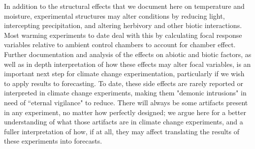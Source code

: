 \documentclass{article}
\begin{document}
\par In addition to the structural effects that we document here on temperature and moisture, experimental structures may alter conditions by reducing light, intercepting precipitation, and altering herbivory and other biotic interactions\citep{kennedy1995,wolkovich2012}. Most warming experiments to date deal with this by calculating focal response variables relative to ambient control chambers to account for chamber effect\citep [e.g.][]{marchin2015}. Further documentation and analysis of the effects on abiotic and biotic factors, as well as in depth interpretation of how these effects may alter focal variables, is an important next step for climate change experimentation, particularly if we wish to apply results to forecasting. To date, these side effects are rarely reported or interpreted in climate change experiments, making them "demonic intrusions" in need of ``eternal vigilance" to reduce\citep{hurlbert1984}. There will always be some artifacts present in any experiment, no matter how perfectly designed; we argue here for a better understanding of what those artifacts are in climate change experiments, and a fuller interpretation of how, if at all, they may affect translating the results of these experiments into forecasts. 
\end{document}
